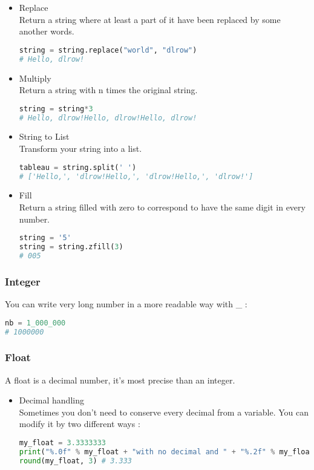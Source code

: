 \documentclass[a4paper, 12pt]{article}
\begin{document}
\begin{itemize}
\item Replace \\
Return a string where at least a part of it have been replaced by some another words.
\begin{lstlisting}[language=Python]
string = string.replace("world", "dlrow")
# Hello, dlrow!
\end{lstlisting}

\item Multiply \\
Return a string with n times the original string.
\begin{lstlisting}[language=Python]
string = string*3
# Hello, dlrow!Hello, dlrow!Hello, dlrow!
\end{lstlisting}

\item String to List \\
Transform your string into a list.
\begin{lstlisting}[language=Python]
tableau = string.split(' ')
# ['Hello,', 'dlrow!Hello,', 'dlrow!Hello,', 'dlrow!']
\end{lstlisting}

\item Fill \\
Return a string filled with zero to correspond to have the same digit in every number.
\begin{lstlisting}[language=Python]
string = '5'
string = string.zfill(3)
# 005
\end{lstlisting}
\end{itemize}

\subsubsection{Integer}
You can write very long number in a more readable way with \_ : 
\begin{lstlisting}[language=Python]
nb = 1_000_000
# 1000000
\end{lstlisting}

\subsubsection{Float}
A float is a decimal number, it's most precise than an integer. \\
\begin{itemize}
\item Decimal handling \\
Sometimes you don't need to conserve every decimal from a variable. You can modify it by two different ways : 
\begin{lstlisting}[language=Python]
my_float = 3.3333333
print("%.0f" % my_float + "with no decimal and " + "%.2f" % my_float + "with two decimals") #3 with no decimal and 3.33 with two decimals
round(my_float, 3) # 3.333
\end{lstlisting}
\end{itemize}
\end{document}
